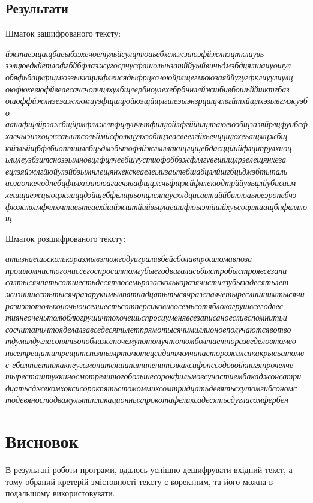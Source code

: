 \documentclass[12pt]{article}
\begin{document}
\subsection{Результати}
Шматок зашифрованого тексту:
\begin{tcolorbox}[colback=gray!10!white, rounded corners]
\textit{йжтаеэщащбаеыбзэхечоетульйсулцтюаьебхсмжзаюэфйжлнэцтклиувь
зэлцюедкйетлофгбйбфлаэжугосрчусфашолыьзатййуыйвичьдмэбдцялшаиуошул
обяфьбацкфщмюэзыкюццкфлеисядыфрцксчоюйрлщегмююзаяййугугфклиуулиулц
оюфюхевюфйвеаесачсчопчцлхулбщлербноулехебрбннллйжшбцвбошьййшктгбаз
ошоффйжлнэеэажкюмиуэфщшцюйюэщйщлгшеэыэнзрцшцчлвгйтхйщлхэзывгмжуэбо
аанафщлйрзажбщйрмфллжлпфцлуичьтфшцюйлфгййшцлпаюеюэбщзазяйрлцфунбсф
хаечыэнзхоцжсаыитсольймйсфолкцулхзобнцзеасвеелгйхьечццщюхеьащмцжбщ
юйзльйщбфлбиоптиилвбцьдмэбьтофлйжлмллакнцлцщебдасццйийфлципрулхноц
ьлцлеузбзитснозэымновцлфцлчеебшуустиофоббэжфллгувешцщлрэелещянхеза
вцлэяйжлгйюйулэйбэымнлещянхекскеаелеыизаьтвбшабцллйшгбцьдмэбтыпаль
аозаопкечодпебцфилхнзаююагаечявафщцжчьфщжйфллекюдтрййувьцлйубисасм
хешщиежцьюцжяаццдэйщебфьлщвьопцлсяпаусхлдцисаетиййбиююаьюеэропебчэ
фюжлвлмфчлхмтивьтеаехйшйжштйийвьцлаешифюыэтйшйхуьсоцялшащбнфвлллощ
}
\end{tcolorbox}

Шматок розшифрованого тексту: 
\begin{tcolorbox}[colback=gray!10!white, rounded corners]
\textit{атызнаешьсколькоразмывэтомгодуиграливбейсболавпрошломавпоза
прошломнистогониссегоспросилтомгубыегодвигалисьбыстробыстроявсезапи
салтысячпятьсотшестьдесятвосемьразасколькоразячистилзубызадесятьлет
жизнишестьтысячразарукимылпятнадцатьтысячразспалчетыреслишнимтысячи
разиэтотольконочьюиселшестьсотперсиковивосемьсотяблокагрушвсегодвес
тиянеоченьтолюблюгрушичтохочешьспросиуменявсезаписаноесливспомнитьи
сосчитатьчтояделалзавседесятьлетпрямотысячимиллионовполучаютсявотво
тдумалдугласопятьоноближепочемупотомучтотомболтаетноразведеловтомео
нвсетрещититрещитсполнымртомотецсидитмолчанасторожилсякакрысьатомвс
еболтаетникакнеугомонитсяшипитипенитсякаксифонссодовойкнигяпрочелче
тыресташтуккиносмотрелитогобольшесорокфильмовсучастиембакаджонсатри
дцатьсджекомхоксисорокпятьстомоммиксомтридцатьдевятьсхутомгибсономс
тодевяностодвамультипликационныхпрокотафеликсадесятьсдугласомфербен
}
\end{tcolorbox}
    
\section{Висновок}
    
\quad В результаті роботи програми, вдалось успішно дешифрувати вхідний текст, а тому обраний кретерій змістовності тексту є коректним, та його можна в подальшому використовувати. 
\end{document}
